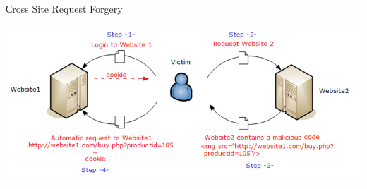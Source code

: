 \begin{frame}[fragile]{Сross Site Request Forgery}
  \begin{center}
    \includegraphics[width=\textwidth, keepaspectratio]{sources/images/csrf.png}
  \end{center}
\end{frame}
